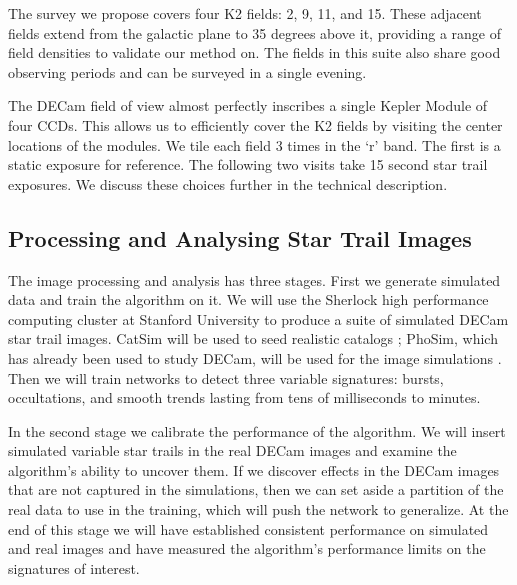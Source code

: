 \documentclass[11pt]{article}
\begin{document}

The survey we propose covers four K2 fields: 2, 9, 11, and 15. These adjacent fields extend from the galactic plane to 35 degrees above it, providing a range of field densities to validate our method on. The fields in this suite also share good observing periods and can be surveyed in a single evening.

The DECam field of view almost perfectly inscribes a single Kepler Module of four CCDs. This allows us to efficiently cover the K2 fields by visiting the center locations of the modules. We tile each field 3 times in the `r' band. The first is a static exposure for reference. The following two visits take 15 second star trail exposures. We discuss these choices further in the technical description. 

\subsection*{Processing and Analysing Star Trail Images}

The image processing and analysis has three stages. First we generate simulated data and train the algorithm on it. We will use the Sherlock high performance computing cluster at Stanford University to produce a suite of simulated DECam star trail images. CatSim will be used to seed realistic catalogs \citep{2014SPIE.9150E..14C}; PhoSim, which has already been used to study DECam, will be used for the image simulations \citep{2015ApJS..218...14P}. Then we will train networks to detect three variable signatures: bursts, occultations, and smooth trends lasting from tens of milliseconds to minutes.

In the second stage we calibrate the performance of the algorithm. We will insert simulated variable star trails in the real DECam images and examine the algorithm's ability to uncover them. If we discover effects in the DECam images that are not captured in the simulations, then we can set aside a partition of the real data to use in the training, which will push the network to generalize. At the end of this stage we will have established consistent performance on simulated and real images and have measured the algorithm's performance limits on the signatures of interest.
\end{document}
